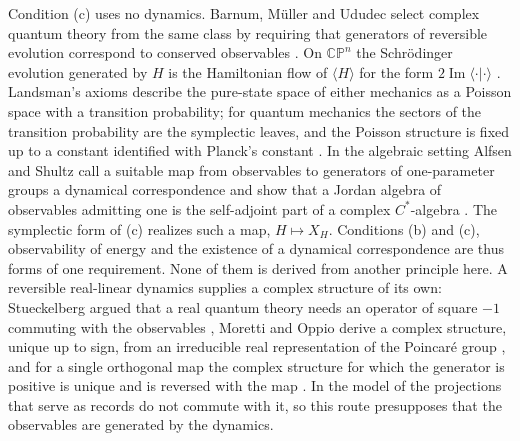 \begin{remark}
Condition (c) uses no dynamics. Barnum, M\"uller and Ududec select complex quantum theory from the same class by requiring that generators of reversible evolution correspond to conserved observables \cite{bmu}. On $\mathbb{CP}^n$ the Schr\"odinger evolution generated by $H$ is the Hamiltonian flow of $\langle H\rangle$ for the form $2\operatorname{Im}\langle\cdot|\cdot\rangle$ \cite{kibble,ashtekar}. Landsman's axioms describe the pure-state space of either mechanics as a Poisson space with a transition probability; for quantum mechanics the sectors of the transition probability are the symplectic leaves, and the Poisson structure is fixed up to a constant identified with Planck's constant \cite{landsman1,landsman2}. In the algebraic setting Alfsen and Shultz call a suitable map from observables to generators of one-parameter groups a dynamical correspondence and show that a Jordan algebra of observables admitting one is the self-adjoint part of a complex $C^*$-algebra \cite{alfsenshultz,baez}. The symplectic form of (c) realizes such a map, $H\mapsto X_H$. Conditions (b) and (c), observability of energy and the existence of a dynamical correspondence are thus forms of one requirement. None of them is derived from another principle here. A reversible real-linear dynamics supplies a complex structure of its own: Stueckelberg argued that a real quantum theory needs an operator of square $-1$ commuting with the observables \cite{stueckelberg}, Moretti and Oppio derive a complex structure, unique up to sign, from an irreducible real representation of the Poincar\'e group \cite{mo}, and for a single orthogonal map the complex structure for which the generator is positive is unique and is reversed with the map \cite{g9}. In the model of \cite{g9} the projections that serve as records do not commute with it, so this route presupposes that the observables are generated by the dynamics.
\end{remark}

